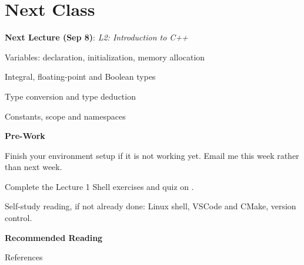 \documentclass[
    10pt,
    dvipsnames,
    svgnames,
    x11names,
    aspectratio=1610,
    english,
    codeminted]{beamer}
\begin{document}
\section{Next Class}
{
\begin{frame}
\begin{compactitem}
  \item \textbf{Next Lecture (Sep 8)}: \textit{L2: Introduction to C++}
  \begin{compactitem}
    \item Variables: declaration, initialization, memory allocation
    \item Integral, floating-point and Boolean types
    \item Type conversion and type deduction
    \item Constants, scope and namespaces
  \end{compactitem}
  \item \textbf{Pre-Work}
  \begin{compactitem}
    \item Finish your environment setup if it is not working yet. Email me this week rather than next week.
    \item Complete the Lecture 1 Shell exercises and quiz on .
    \item Self-study reading, if not already done: Linux shell, VSCode and CMake, version control.
  \end{compactitem}
  \item \textbf{Recommended Reading}
  \begin{compactitem}
  \small
    \item {}
    \item {}
  \end{compactitem}
\end{compactitem}
\end{frame}
}
\appendix
\begin{frame}{References}
\scriptsize
  \printbibliography[heading=none]
\end{frame}
\end{document}
